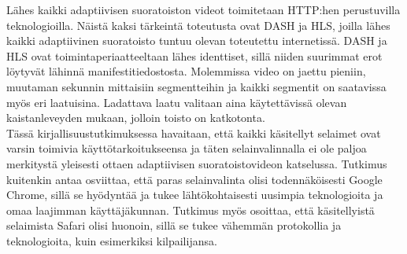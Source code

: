 \documentclass[finnish, 12pt, a4paper, elec, utf8, a-1b, online]{aaltothesis}
\begin{document}
\noindent Lähes kaikki adaptiivisen suoratoiston videot toimitetaan HTTP:hen perustuvilla teknologioilla. Näistä kaksi tärkeintä toteutusta ovat DASH ja HLS, joilla lähes kaikki adaptiivinen suoratoisto tuntuu olevan toteutettu internetissä. DASH ja HLS ovat toimintaperiaatteeltaan lähes identtiset, sillä niiden suurimmat erot löytyvät lähinnä manifestitiedostosta. Molemmissa video on jaettu pieniin, muutaman sekunnin mittaisiin segmentteihin ja kaikki segmentit on saatavissa myös eri laatuisina. Ladattava laatu valitaan aina käytettävissä olevan kaistanleveyden mukaan, jolloin toisto on katkotonta. \\

\noindent Tässä kirjallisuustutkimuksessa havaitaan, että kaikki käsitellyt selaimet ovat varsin toimivia käyttötarkoitukseensa ja täten selainvalinnalla ei ole paljoa merkitystä yleisesti ottaen adaptiivisen suoratoistovideon katselussa. Tutkimus kuitenkin antaa osviittaa, että paras selainvalinta olisi todennäköisesti Google Chrome, sillä se hyödyntää ja tukee lähtökohtaisesti uusimpia teknologioita ja omaa laajimman käyttäjäkunnan. Tutkimus myös osoittaa, että käsitellyistä selaimista Safari olisi huonoin, sillä se tukee vähemmän protokollia ja teknologioita, kuin esimerkiksi kilpailijansa.

\clearpage
\end{document}
